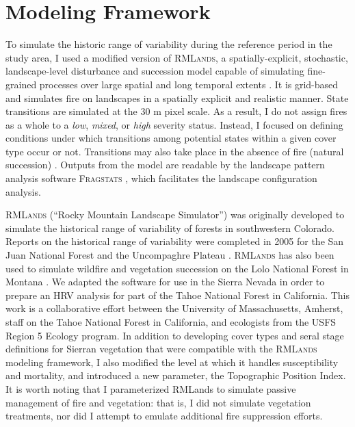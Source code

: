 \section{Modeling Framework}

To simulate the historic range of variability during the reference period in the study area, I used a modified version of \textsc{RMLands}, a spatially-explicit, stochastic, landscape-level disturbance and succession model capable of simulating fine-grained processes over large spatial and long temporal extents \citep{McGarigal2005}. It is grid-based and simulates fire on landscapes in a spatially explicit and realistic manner. State transitions are simulated at the 30 m pixel scale. As a result, I do not assign fires as a whole to a \emph{low}, \emph{mixed}, or \emph{high} severity status. Instead, I focused on defining conditions under which transitions among potential states within a given cover type occur or not. Transitions may also take place in the absence of fire (natural succession) \citep{McGarigal2012}. Outputs from the model are readable by the landscape pattern analysis software \textsc{Fragstats} \citep{Fragstats2012}, which facilitates the landscape configuration analysis.

\textsc{RMLands} (``Rocky Mountain Landscape Simulator'') was originally developed to simulate the historical range of variability of forests in southwestern Colorado. Reports on the historical range of variability were completed in 2005 for the San Juan National Forest and the Uncompaghre Plateau \citep{McGarigal2005,McGarigal2005a}. \textsc{RMLands} has also been used to simulate wildfire and vegetation succession on the Lolo National Forest in Montana \citep{Cushman2011}. We adapted the software for use in the Sierra Nevada in order to prepare an HRV analysis for part of the Tahoe National Forest in California. This work is a collaborative effort between the University of Massachusetts, Amherst, staff on the Tahoe National Forest in California, and ecologists from the USFS Region 5 Ecology program. In addition to developing cover types and seral stage definitions for Sierran vegetation that were compatible with the \textsc{RMLands} modeling framework, I also modified the level at which it handles susceptibility and mortality, and introduced a new parameter, the Topographic Position Index. It is worth noting that I parameterized RMLands to simulate passive management of fire and vegetation: that is, I did not simulate vegetation treatments, nor did I attempt to emulate additional fire suppression efforts.






